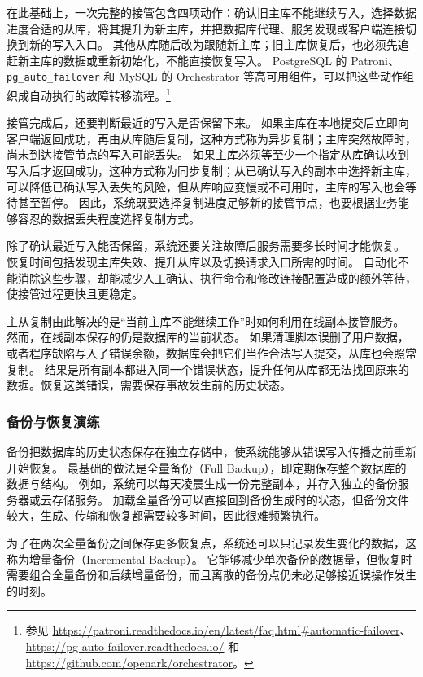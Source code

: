在此基础上，一次完整的接管包含四项动作：确认旧主库不能继续写入，选择数据进度合适的从库，将其提升为新主库，并把数据库代理、服务发现或客户端连接切换到新的写入入口。
其他从库随后改为跟随新主库；旧主库恢复后，也必须先追赶新主库的数据或重新初始化，不能直接恢复写入。
PostgreSQL 的 Patroni、\texttt{pg\_auto\_failover} 和 MySQL 的 Orchestrator 等高可用组件，可以把这些动作组织成自动执行的故障转移流程。\footnote{参见 \url{https://patroni.readthedocs.io/en/latest/faq.html\#automatic-failover}、\url{https://pg-auto-failover.readthedocs.io/} 和 \url{https://github.com/openark/orchestrator}。}

接管完成后，还要判断最近的写入是否保留下来。
如果主库在本地提交后立即向客户端返回成功，再由从库随后复制，这种方式称为异步复制；主库突然故障时，尚未到达接管节点的写入可能丢失。
如果主库必须等至少一个指定从库确认收到写入后才返回成功，这种方式称为同步复制；从已确认写入的副本中选择新主库，可以降低已确认写入丢失的风险，但从库响应变慢或不可用时，主库的写入也会等待甚至暂停。
因此，系统既要选择复制进度足够新的接管节点，也要根据业务能够容忍的数据丢失程度选择复制方式。

除了确认最近写入能否保留，系统还要关注故障后服务需要多长时间才能恢复。
恢复时间包括发现主库失效、提升从库以及切换请求入口所需的时间。
自动化不能消除这些步骤，却能减少人工确认、执行命令和修改连接配置造成的额外等待，使接管过程更快且更稳定。

主从复制由此解决的是“当前主库不能继续工作”时如何利用在线副本接管服务。
然而，在线副本保存的仍是数据库的当前状态。
如果清理脚本误删了用户数据，或者程序缺陷写入了错误余额，数据库会把它们当作合法写入提交，从库也会照常复制。
结果是所有副本都进入同一个错误状态，提升任何从库都无法找回原来的数据。恢复这类错误，需要保存事故发生前的历史状态。


\subsubsection{备份与恢复演练}\label{sec4:backup-and-recovery}

备份把数据库的历史状态保存在独立存储中，使系统能够从错误写入传播之前重新开始恢复。
最基础的做法是全量备份（Full Backup），即定期保存整个数据库的数据与结构。
例如，系统可以每天凌晨生成一份完整副本，并存入独立的备份服务器或云存储服务。
加载全量备份可以直接回到备份生成时的状态，但备份文件较大，生成、传输和恢复都需要较多时间，因此很难频繁执行。

为了在两次全量备份之间保存更多恢复点，系统还可以只记录发生变化的数据，这称为增量备份（Incremental Backup）。
它能够减少单次备份的数据量，但恢复时需要组合全量备份和后续增量备份，而且离散的备份点仍未必足够接近误操作发生的时刻。

